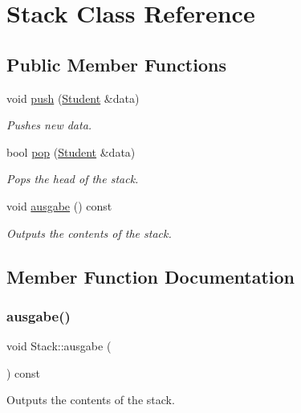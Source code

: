 \hypertarget{class_stack}{}\section{Stack Class Reference}
\label{class_stack}
\subsection*{Public Member Functions}
\begin{DoxyCompactItemize}
\item 
void \hyperlink{class_stack_a1dcd555343970b129f9c1ce97a124d9c}{push} (\hyperlink{class_student}{Student} \&data)
\begin{DoxyCompactList}\small\item\em Pushes new data. \end{DoxyCompactList}\item 
bool \hyperlink{class_stack_a4e55c97d719b832e159894421f7b9d3d}{pop} (\hyperlink{class_student}{Student} \&data)
\begin{DoxyCompactList}\small\item\em Pops the head of the stack. \end{DoxyCompactList}\item 
void \hyperlink{class_stack_a15f5b63e791731edc265d74ec43c95f1}{ausgabe} () const
\begin{DoxyCompactList}\small\item\em Outputs the contents of the stack. \end{DoxyCompactList}\end{DoxyCompactItemize}


\subsection{Member Function Documentation}
\mbox{\label{class_stack_a15f5b63e791731edc265d74ec43c95f1}} 
\subsubsection{\texorpdfstring{ausgabe()}{ausgabe()}}
{\footnotesize\ttfamily void Stack\+::ausgabe (\begin{DoxyParamCaption}{ }\end{DoxyParamCaption}) const}



Outputs the contents of the stack. 

